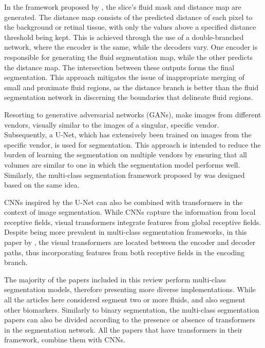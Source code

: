 \par
In the framework proposed by \textcite{Liu2021}, the  slice's fluid mask and distance map are generated. The distance map consists of the predicted distance of each pixel to the background or retinal tissue, with only the values above a specified distance threshold being kept. This is achieved through the use of a double-branched network, where the encoder is the same, while the decoders vary. One encoder is responsible for generating the fluid segmentation map, while the other predicts the distance map. The intersection between these outputs forms the final segmentation. This approach mitigates the issue of inappropriate merging of small and proximate fluid regions, as the distance branch is better than the fluid segmentation network in discerning the boundaries that delineate fluid regions.
\par
Resorting to generative adversarial networks (GANs), \textcite{Wu2023} make images from different vendors, visually similar to the images of a singular, specific vendor. Subsequently, a U-Net, which has extensively been trained on images from the specific vendor, is used for segmentation. This approach is intended to reduce the burden of learning the segmentation on multiple vendors by ensuring that all volumes are similar to one in which the segmentation model performs well. Similarly, the multi-class segmentation framework proposed by \textcite{Li2023} was designed based on the same idea. 
\par
CNNs inspired by the U-Net can also be combined with transformers in the context of image segmentation. While CNNs capture the information from local receptive fields, visual transformers integrate features from global receptive fields. Despite being more prevalent in multi-class segmentation frameworks, in this paper by \textcite{Quek2022}, the visual transformers are located between the encoder and decoder paths, thus incorporating features from both receptive fields in the encoding branch.
\par
The majority of the papers included in this review perform multi-class segmentation models, therefore presenting more diverse implementations. While all the articles here considered segment two or more fluids, \textcite{Hassan2021a} and \textcite{Padilla2022} also segment other biomarkers. Similarly to binary segmentation, the multi-class segmentation papers can also be divided according to the presence \parencite{Zhang2023, Liu2024} or absence \parencite{Rahil2023, Hassan2021a, Sappa2021, Xing2022, Tang2022, Padilla2022, Hu2019, Mantel2021, Li2023, Gao2019, Hassan2021b, Lu2019} of transformers in the segmentation network. All the papers that have transformers in their framework, combine them with CNNs. 

